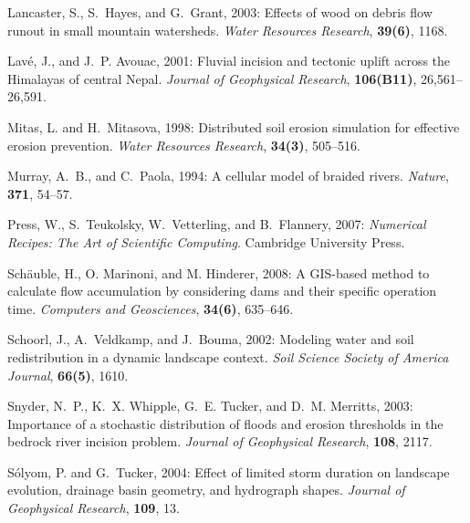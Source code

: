 \documentclass[12pt,reqno]{amsart}
\begin{document}
\begin{thebibliography}{41}
Lancaster, S., S.~Hayes, and G.~Grant, 2003: {Effects of wood on debris flow
  runout in small mountain watersheds}. {\em Water Resources Research\/}, {\bf
  39(6)}, 1168.

Lav\'{e}, J., and J.~P. Avouac, 2001: Fluvial incision and tectonic
  uplift across the Himalayas of central Nepal. {\em Journal of 
  Geophysical Research\/}, {\bf 106(B11)}, {26,561--26,591}.

Mitas, L. and H.~Mitasova, 1998: {Distributed soil erosion simulation for
  effective erosion prevention}. {\em Water Resources Research\/}, {\bf 34(3)},
  505--516.

Murray, A.~B., and C.~Paola, 1994: A cellular model of braided
  rivers. {\em Nature\/}, {\bf 371}, 54--57.

Press, W., S.~Teukolsky, W.~Vetterling, and B.~Flannery, 2007: {\em {Numerical
  Recipes: The Art of Scientific Computing}\/}. Cambridge University Press.
  
Sch\"{a}uble, H., O. Marinoni, and M. Hinderer, 2008: {A GIS-based method to 
  calculate flow accumulation by considering dams and their specific operation 
  time}. {\em Computers and Geosciences\/}, {\bf 34(6)}, {635--646}.

Schoorl, J., A.~Veldkamp, and J.~Bouma, 2002: {Modeling water and soil
  redistribution in a dynamic landscape context}. {\em Soil Science Society of
  America Journal\/}, {\bf 66(5)}, 1610.

Snyder, N.~P., K.~X. Whipple, G.~E. Tucker, and D.~M. Merritts, 2003:
  Importance of a stochastic distribution of floods and erosion thresholds in
  the bedrock river incision problem. {\em Journal of Geophysical Research\/},
  {\bf 108}, 2117.

S\'{o}lyom, P. and G.~Tucker, 2004: {Effect of limited storm duration on
  landscape evolution, drainage basin geometry, and hydrograph shapes}. {\em
  Journal of Geophysical Research\/}, {\bf 109}, 13.


\end{thebibliography}
\end{document}
